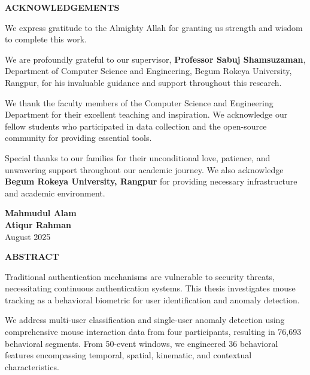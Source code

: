 \documentclass[
  11pt,
  a4paper,
]{article}
\begin{document}
\newpage

\newpage
\thispagestyle{plain}

\begin{center}
\vspace*{2cm}
\textbf{\Large ACKNOWLEDGEMENTS}
\end{center}

\vspace*{2cm}

We express gratitude to the Almighty Allah for granting us strength and
wisdom to complete this work.

We are profoundly grateful to our supervisor,
\textbf{Professor Sabuj Shamsuzaman}, Department of Computer Science and
Engineering, Begum Rokeya University, Rangpur, for his invaluable
guidance and support throughout this research.

We thank the faculty members of the Computer Science and Engineering
Department for their excellent teaching and inspiration. We acknowledge
our fellow students who participated in data collection and the
open-source community for providing essential tools.

Special thanks to our families for their unconditional love, patience,
and unwavering support throughout our academic journey. We also
acknowledge \textbf{Begum Rokeya University, Rangpur} for providing
necessary infrastructure and academic environment.

\vspace*{2cm}

\begin{flushright}
\textbf{Mahmudul Alam}\\
\textbf{Atiqur Rahman}\\
August 2025
\end{flushright}

\newpage

\newpage
\thispagestyle{plain}

\begin{center}
\vspace*{2cm}
\textbf{\Large ABSTRACT}
\end{center}

\vspace*{2cm}

Traditional authentication mechanisms are vulnerable to security
threats, necessitating continuous authentication systems. This thesis
investigates mouse tracking as a behavioral biometric for user
identification and anomaly detection.

We address multi-user classification and single-user anomaly detection
using comprehensive mouse interaction data from four participants,
resulting in 76,693 behavioral segments. From 50-event windows, we
engineered 36 behavioral features encompassing temporal, spatial,
kinematic, and contextual characteristics.
\end{document}
